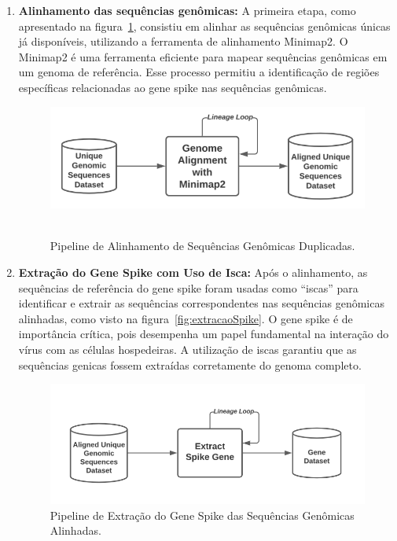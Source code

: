 \begin{enumerate}
  \item \textbf{Alinhamento das sequências genômicas:} A primeira etapa, como apresentado na figura~\ref{fig:alinhamentoGenomas}, consistiu em alinhar as sequências genômicas únicas já disponíveis, utilizando a ferramenta de alinhamento Minimap2. O Minimap2 é uma ferramenta eficiente para mapear sequências genômicas em um genoma de referência. Esse processo permitiu a identificação de regiões específicas relacionadas ao gene spike nas sequências genômicas.
        \begin{figure}[htb]
          \centering
          \caption{Pipeline de Alinhamento de Sequências Genômicas Duplicadas.}
          \includegraphics[scale=0.45]{figuras/pipelines/alinhamento_genoma.png}
          ~\label{fig:alinhamentoGenomas}
        \end{figure}
  \item \textbf{Extração do Gene Spike com Uso de Isca:} Após o alinhamento, as sequências de referência do gene spike foram usadas como ``iscas'' para identificar e extrair as sequências correspondentes nas sequências genômicas alinhadas, como visto na figura~\ref{fig:extracaoSpike}. O gene spike é de importância crítica, pois desempenha um papel fundamental na interação do vírus com as células hospedeiras. A utilização de iscas garantiu que as sequências genicas fossem extraídas corretamente do genoma completo.
        \begin{figure}[htb]
          \centering
          \caption{Pipeline de Extração do Gene Spike das Sequências Genômicas Alinhadas.}
          \includegraphics[scale=0.45]{figuras/pipelines/extracao_gene_spike.png}

\end{figure}
\end{enumerate}
